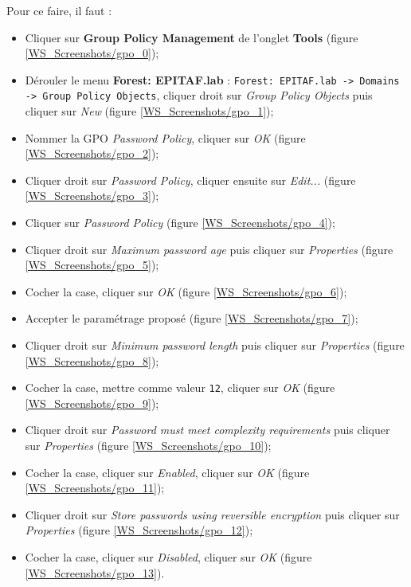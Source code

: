 Pour ce faire, il faut :
\begin{itemize}
    \item Cliquer sur \textbf{Group Policy Management} de l'onglet \textbf{Tools} (figure \ref{WS_Screenshots/gpo_0});
    \item Dérouler le menu \textbf{Forest: EPITAF.lab} : \texttt{Forest: EPITAF.lab -> Domains -> Group Policy Objects}, cliquer droit sur \textit{Group Policy Objects} puis cliquer sur \textit{New} (figure \ref{WS_Screenshots/gpo_1});
    \item Nommer la GPO \textit{Password Policy}, cliquer sur \textit{OK} (figure \ref{WS_Screenshots/gpo_2});
    \item Cliquer droit sur \textit{Password Policy}, cliquer ensuite sur \textit{Edit...} (figure \ref{WS_Screenshots/gpo_3});
    \item Cliquer sur \textit{Password Policy} (figure \ref{WS_Screenshots/gpo_4});
    \item Cliquer droit sur \textit{Maximum password age} puis cliquer sur \textit{Properties} (figure \ref{WS_Screenshots/gpo_5});
    \item Cocher la case, cliquer sur \textit{OK} (figure \ref{WS_Screenshots/gpo_6});
    \item Accepter le paramétrage proposé (figure \ref{WS_Screenshots/gpo_7});
    \item Cliquer droit sur \textit{Minimum password length} puis cliquer sur \textit{Properties} (figure \ref{WS_Screenshots/gpo_8});
    \item Cocher la case, mettre comme valeur \texttt{12}, cliquer sur \textit{OK} (figure \ref{WS_Screenshots/gpo_9});
    \item Cliquer droit sur \textit{Password must meet complexity requirements} puis cliquer sur \textit{Properties} (figure \ref{WS_Screenshots/gpo_10});
    \item Cocher la case, cliquer sur \textit{Enabled}, cliquer sur \textit{OK} (figure \ref{WS_Screenshots/gpo_11});
    \item Cliquer droit sur \textit{Store passwords using reversible encryption} puis cliquer sur \textit{Properties} (figure \ref{WS_Screenshots/gpo_12});
    \item Cocher la case, cliquer sur \textit{Disabled}, cliquer sur \textit{OK} (figure \ref{WS_Screenshots/gpo_13}).
\end{itemize}

